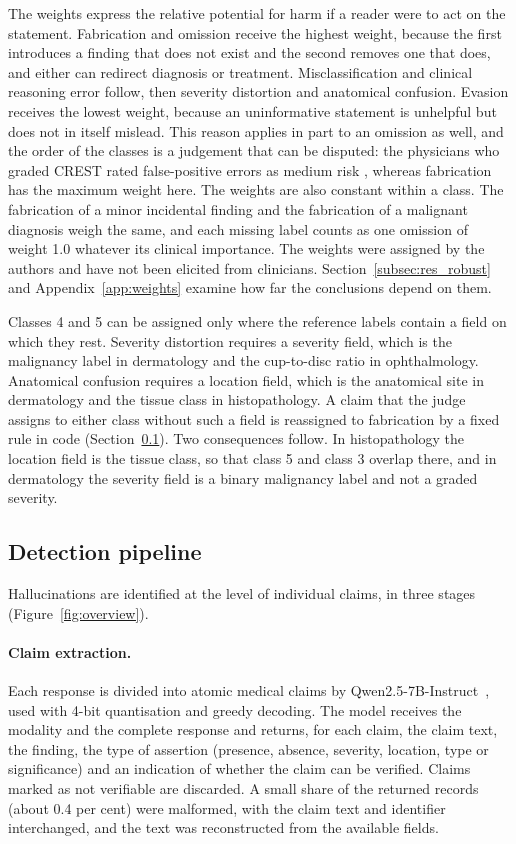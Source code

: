 \documentclass[11pt,a4paper]{article}
\begin{document}
The weights express the relative potential for harm if a reader were to act on the statement. Fabrication and omission receive the highest weight, because the first introduces a finding that does not exist and the second removes one that does, and either can redirect diagnosis or treatment. Misclassification and clinical reasoning error follow, then severity distortion and anatomical confusion. Evasion receives the lowest weight, because an uninformative statement is unhelpful but does not in itself mislead. This reason applies in part to an omission as well, and the order of the classes is a judgement that can be disputed: the physicians who graded CREST rated false-positive errors as medium risk \citep{crest2025medrxiv}, whereas fabrication has the maximum weight here. The weights are also constant within a class. The fabrication of a minor incidental finding and the fabrication of a malignant diagnosis weigh the same, and each missing label counts as one omission of weight 1.0 whatever its clinical importance. The weights were assigned by the authors and have not been elicited from clinicians. Section~\ref{subsec:res_robust} and Appendix~\ref{app:weights} examine how far the conclusions depend on them.

Classes 4 and 5 can be assigned only where the reference labels contain a field on which they rest. Severity distortion requires a severity field, which is the malignancy label in dermatology and the cup-to-disc ratio in ophthalmology. Anatomical confusion requires a location field, which is the anatomical site in dermatology and the tissue class in histopathology. A claim that the judge assigns to either class without such a field is reassigned to fabrication by a fixed rule in code (Section~\ref{sec:pipeline}). Two consequences follow. In histopathology the location field is the tissue class, so that class 5 and class 3 overlap there, and in dermatology the severity field is a binary malignancy label and not a graded severity.

\subsection{Detection pipeline}\label{sec:pipeline}
Hallucinations are identified at the level of individual claims, in three stages (Figure~\ref{fig:overview}).

\paragraph{Claim extraction.} Each response is divided into atomic medical claims by Qwen2.5-7B-Instruct~\citep{qwen2024qwen25}, used with 4-bit quantisation and greedy decoding. The model receives the modality and the complete response and returns, for each claim, the claim text, the finding, the type of assertion (presence, absence, severity, location, type or significance) and an indication of whether the claim can be verified. Claims marked as not verifiable are discarded. A small share of the returned records (about 0.4 per cent) were malformed, with the claim text and identifier interchanged, and the text was reconstructed from the available fields.
\end{document}
